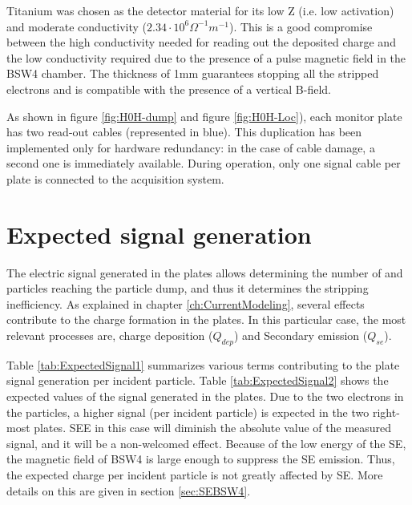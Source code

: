 Titanium was chosen as the detector material for its low Z (i.e. low activation) and moderate conductivity ($2.34\cdot 10^6 \Omega^{-1} m^{-1}$). This is a good compromise between the high conductivity needed for reading out the deposited charge and the low conductivity required due to the presence of a pulse magnetic field in the BSW4 chamber. The thickness of 1mm guarantees stopping all the stripped electrons and is compatible with the presence of a vertical B-field. 

As shown in figure \ref{fig:H0H-dump} and figure \ref{fig:H0H-Loc}), each monitor plate has two read-out cables (represented in blue). This duplication has been implemented only for hardware redundancy: in the case of cable damage, a second one is immediately available. During operation, only one signal cable per plate is connected to the acquisition system.

\section{Expected signal generation}

The electric signal generated in the plates allows determining the number of \hzz and \hm particles reaching the particle dump, and thus it determines the stripping inefficiency. As explained in chapter \ref{ch:CurrentModeling}, several effects contribute to the charge formation in the plates. In this particular case, the most relevant processes are, charge deposition ($Q_{dep}$) and Secondary emission ($Q_{se}$). 

Table \ref{tab:ExpectedSignal1} summarizes various terms contributing to the plate signal generation per incident particle. Table \ref{tab:ExpectedSignal2} shows the expected values of the signal generated in the \hzhm plates. Due to the two electrons in the \hm particles, a higher signal (per incident particle) is expected in the two right-most plates. SEE in this case will diminish the absolute value of the measured signal, and it will be a non-welcomed effect. Because of the low energy of the SE, the magnetic field of BSW4 is large enough to suppress the SE emission. Thus, the expected charge per incident particle is not greatly affected by SE. More details on this are given in section \ref{sec:SEBSW4}.

